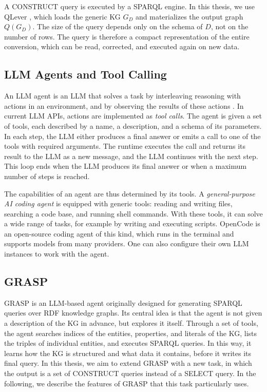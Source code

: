 A CONSTRUCT query is executed by a SPARQL engine. In this thesis, we use QLever \citep{bast2017qlever}, which loads the generic KG $G_D$ and materializes the output graph $Q(G_D)$. The size of the query depends only on the schema of $D$, not on the number of rows. The query is therefore a compact representation of the entire conversion, which can be read, corrected, and executed again on new data.

\subsection{LLM Agents and Tool Calling}
\label{sec:bg-agents}

An LLM agent is an LLM that solves a task by interleaving reasoning with actions in an environment, and by observing the results of these actions \citep{yao2023react}. In current LLM APIs, actions are implemented as \emph{tool calls}. The agent is given a set of tools, each described by a name, a description, and a schema of its parameters. In each step, the LLM either produces a final answer or emits a call to one of the tools with required arguments. The runtime executes the call and returns its result to the LLM as a new message, and the LLM continues with the next step. This loop ends when the LLM produces its final answer or when a maximum number of steps is reached.

The capabilities of an agent are thus determined by its tools. A \emph{general-purpose AI coding agent} is equipped with generic tools: reading and writing files, searching a code base, and running shell commands. With these tools, it can solve a wide range of tasks, for example by writing and executing scripts. OpenCode \citep{opencode} is an open-source coding agent of this kind, which runs in the terminal and supports models from many providers. One can also configure their own LLM instances to work with the agent.

\subsection{GRASP}\label{sec:bg-grasp}

GRASP \citep{walter2025grasp} is an LLM-based agent originally designed for generating SPARQL queries over RDF knowledge graphs. Its central idea is that the agent is not given a description of the KG in advance, but explores it itself. Through a set of tools, the agent searches indices of the entities, properties, and literals of the KG, lists the triples of individual entities, and executes SPARQL queries. In this way, it learns how the KG is structured and what data it contains, before it writes its final query. In this thesis, we aim to extend GRASP with a new task, in which the output is a set of CONSTRUCT queries instead of a SELECT query. In the following, we describe the features of GRASP that this task particularly uses.

